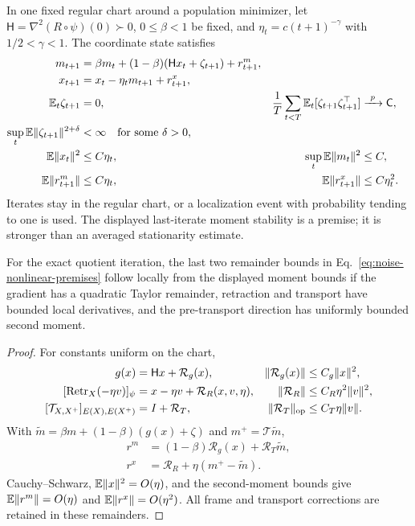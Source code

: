 \begin{assumption}
\label{ass:noise-nonlinear}
In one fixed regular chart around a population minimizer, let
$\mathsf H=\nabla^2(R\circ\psi)(0)\succ0$,
$0\leq\beta<1$ be fixed, and
$\eta_t=c(t+1)^{-\gamma}$ with $1/2<\gamma<1$.
The coordinate state satisfies
\begin{align}
m_{t+1}
&=\beta m_t+(1-\beta)(\mathsf Hx_t+\zeta_{t+1})+r^m_{t+1},\\
x_{t+1}&=x_t-\eta_tm_{t+1}+r^x_{t+1},\\
\mathbb E_t\zeta_{t+1}&=0,&
\frac1T\sum_{t<T}\mathbb E_t[\zeta_{t+1}\zeta_{t+1}^\top]
&\xrightarrow{\ p\ }\mathsf C,\\
\sup_t\mathbb E\|\zeta_{t+1}\|^{2+\delta}&<\infty
\quad\text{for some }\delta>0,\\
\mathbb E\|x_t\|^2&\leq C\eta_t,&
\sup_t\mathbb E\|m_t\|^2&\leq C,\\
\mathbb E\|r^m_{t+1}\|&\leq C\eta_t,&
\mathbb E\|r^x_{t+1}\|&\leq C\eta_t^2 .
\label{eq:noise-nonlinear-premises}
\end{align}
Iterates stay in the regular chart, or a localization event with
probability tending to one is used. The displayed last-iterate
moment stability is a premise; it is stronger than an averaged
stationarity estimate.
\end{assumption}

\begin{proposition}
For the exact quotient iteration, the last two remainder bounds in
Eq.~\eqref{eq:noise-nonlinear-premises} follow locally from the
displayed moment bounds if the gradient has a quadratic Taylor
remainder, retraction and transport have bounded local derivatives,
and the pre-transport direction has uniformly bounded second moment.
\end{proposition}
\begin{proof}
For constants uniform on the chart,
\begin{align}
g(x)&=\mathsf Hx+\mathcal R_g(x),&
\|\mathcal R_g(x)\|&\leq C_g\|x\|^2,\\
[\operatorname{Retr}_X(-\eta v)]_\psi
&=x-\eta v+\mathcal R_R(x,v,\eta),&
\|\mathcal R_R\|&\leq C_R\eta^2\|v\|^2,\\
[\mathcal T_{X,X^+}]_{E(X),E(X^+)}
&=I+\mathcal R_T,&
\|\mathcal R_T\|_{\rm op}&\leq C_T\eta\|v\| .
\end{align}
With $\widetilde m=\beta m+(1-\beta)(g(x)+\zeta)$ and
$m^+=\mathcal T\widetilde m$,
\begin{align}
r^m&=(1-\beta)\mathcal R_g(x)+
\mathcal R_T\widetilde m,\\
r^x&=\mathcal R_R+\eta(m^+-\widetilde m).
\end{align}
Cauchy--Schwarz, $\mathbb E\|x\|^2=O(\eta)$, and the second-moment
bounds give $\mathbb E\|r^m\|=O(\eta)$ and
$\mathbb E\|r^x\|=O(\eta^2)$. All frame and transport corrections are
retained in these remainders.
\end{proof}

